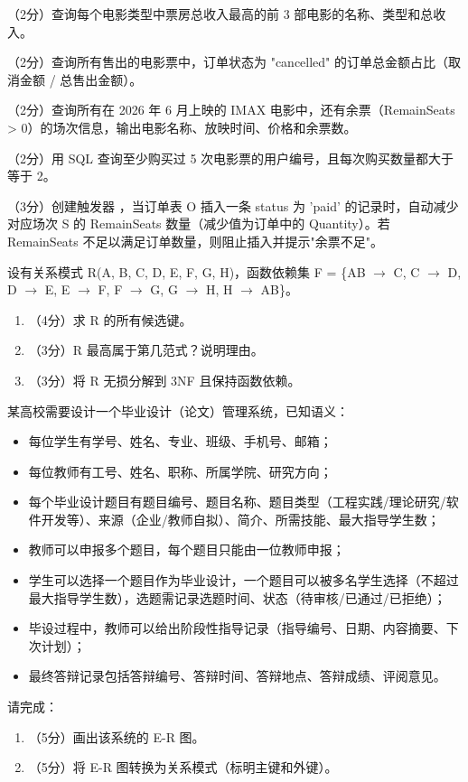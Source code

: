 \documentclass[a4paper,11pt]{article}
\begin{document}
\q （2分）查询每个电影类型中票房总收入最高的前 3 部电影的名称、类型和总收入。
\anslines{1.2cm}

\q （2分）查询所有售出的电影票中，订单状态为 "cancelled" 的订单总金额占比（取消金额 / 总售出金额）。
\anslines{1cm}

\q （2分）查询所有在 2026 年 6 月上映的 IMAX 电影中，还有余票（RemainSeats > 0）的场次信息，输出电影名称、放映时间、价格和余票数。
\anslines{1cm}

\q （2分）用 SQL 查询至少购买过 5 次电影票的用户编号，且每次购买数量都大于等于 2。
\anslines{1.2cm}

\q （3分）创建触发器 ，当订单表 O 插入一条 status 为 'paid' 的记录时，自动减少对应场次 S 的 RemainSeats 数量（减少值为订单中的 Quantity）。若 RemainSeats 不足以满足订单数量，则阻止插入并提示"余票不足"。
\anslines{1.5cm}


\q 设有关系模式 R(A, B, C, D, E, F, G, H)，函数依赖集 F = \{AB $\rightarrow$ C, C $\rightarrow$ D, D $\rightarrow$ E, E $\rightarrow$ F, F $\rightarrow$ G, G $\rightarrow$ H, H $\rightarrow$ AB\}。

\begin{enumerate}[leftmargin=2em, itemsep=3pt]
  \item[（1）] （4分）求 R 的所有候选键。
  \item[（2）] （3分）R 最高属于第几范式？说明理由。
  \item[（3）] （3分）将 R 无损分解到 3NF 且保持函数依赖。
\end{enumerate}

\anslines{4cm}


\q 某高校需要设计一个毕业设计（论文）管理系统，已知语义：
\begin{itemize}
  \item 每位学生有学号、姓名、专业、班级、手机号、邮箱；
  \item 每位教师有工号、姓名、职称、所属学院、研究方向；
  \item 每个毕业设计题目有题目编号、题目名称、题目类型（工程实践/理论研究/软件开发等）、来源（企业/教师自拟）、简介、所需技能、最大指导学生数；
  \item 教师可以申报多个题目，每个题目只能由一位教师申报；
  \item 学生可以选择一个题目作为毕业设计，一个题目可以被多名学生选择（不超过最大指导学生数），选题需记录选题时间、状态（待审核/已通过/已拒绝）；
  \item 毕设过程中，教师可以给出阶段性指导记录（指导编号、日期、内容摘要、下次计划）；
  \item 最终答辩记录包括答辩编号、答辩时间、答辩地点、答辩成绩、评阅意见。
\end{itemize}
请完成：
\begin{enumerate}[leftmargin=2em, itemsep=3pt]
  \item[（1）] （5分）画出该系统的 E-R 图。
  \item[（2）] （5分）将 E-R 图转换为关系模式（标明主键和外键）。
\end{enumerate}
\end{document}
